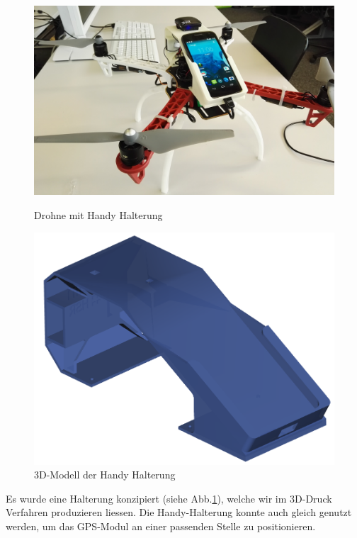 \begin{figure}[H]
	\centering
	\begin{minipage}[b]{0.4\textwidth}
		\includegraphics[width=\textwidth]{images/hardware/drone-with-handy.jpg}
	\caption{Drohne mit Handy Halterung}
	\label{fig:prototyp-3}
	\end{minipage}
	\hfill
	\begin{minipage}[b]{0.4\textwidth}
		\includegraphics[width=\textwidth]{images/hardware/case-model.png}
	\caption{3D-Modell der Handy Halterung}
	\label{fig:case-model}
	\end{minipage}
\end{figure}

Es wurde eine Halterung konzipiert (siehe Abb.\ref{fig:case-model}), welche wir im 3D-Druck Verfahren produzieren liessen.
Die Handy-Halterung konnte auch gleich genutzt werden, um das GPS-Modul an einer passenden Stelle zu positionieren. 

